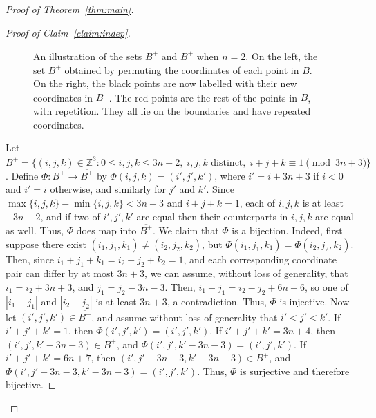 \documentclass{article}
\begin{document}
\begin{proof}[Proof of Theorem~\ref{thm:main}]
\begin{proof}[Proof of Claim~\ref{claim:indep}]
\begin{figure}[h]
\begin{minipage}{0.49\textwidth}
\begin{center}
\end{center}
\end{minipage}
    \caption{An illustration of the sets $B^+$ and $\overline{B^+}$ when $n=2$. On the left, the set $B^+$ obtained by permuting the coordinates of each point in $B$. On the right, the black points are now labelled with their new coordinates in $\overline{B^+}$. The red points are the rest of the points in $\overline{B}$, with repetition. They all lie on the boundaries and have repeated coordinates.}\label{fig:symmetry}
\end{figure}

Let $\overline{B^+}=\{(i,j,k)\in\mathbb{Z}^3:0\leq i,j,k\leq 3n+2,\;i,j,k\text{ distinct},\;i+j+k\equiv1\pmod{3n+3}\}$. Define $\Phi:B^+\to\overline{B^+}$ by $\Phi(i,j,k)=(i',j',k')$, where $i'=i+3n+3$ if $i<0$ and $i'=i$ otherwise, and similarly for $j'$ and $k'$. Since $\max\{i,j,k\}-\min\{i,j,k\}<3n+3$ and $i+j+k=1$, each of $i,j,k$ is at least $-3n-2$, and if two of $i',j',k'$ are equal then their counterparts in $i,j,k$ are equal as well. Thus, $\Phi$ does map into $\overline{B^+}$. We claim that $\Phi$ is a bijection. Indeed, first suppose there exist $(i_1,j_1,k_1)\not=(i_2,j_2,k_2)$, but $\Phi(i_1,j_1,k_1)=\Phi(i_2,j_2,k_2)$. Then, since $i_1+j_1+k_1=i_2+j_2+k_2=1$, and each corresponding coordinate pair can differ by at most $3n+3$, we can assume, without loss of generality, that $i_1=i_2+3n+3$, and $j_1=j_2-3n-3$. Then, $i_1-j_1=i_2-j_2+6n+6$, so one of $|i_1-j_1|$ and $|i_2-j_2|$ is at least $3n+3$, a contradiction. Thus, $\Phi$ is injective. Now let $(i',j',k')\in\overline{B^+}$, and assume without loss of generality that $i'<j'<k'$. If $i'+j'+k'=1$, then $\Phi(i',j',k')=(i',j',k')$. If $i'+j'+k'=3n+4$, then $(i',j',k'-3n-3)\in B^+$, and $\Phi(i',j',k'-3n-3)=(i',j',k')$. If $i'+j'+k'=6n+7$, then $(i',j'-3n-3,k'-3n-3)\in B^+$, and $\Phi(i',j'-3n-3,k'-3n-3)=(i',j',k')$. Thus, $\Phi$ is surjective and therefore bijective. 


\end{proof}
\end{proof}
\end{document}
